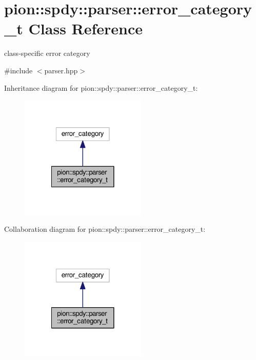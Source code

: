 \hypertarget{classpion_1_1spdy_1_1parser_1_1error__category__t}{\section{pion\-:\-:spdy\-:\-:parser\-:\-:error\-\_\-category\-\_\-t Class Reference}
\label{classpion_1_1spdy_1_1parser_1_1error__category__t}
}


class-\/specific error category  




{\ttfamily \#include $<$parser.\-hpp$>$}



Inheritance diagram for pion\-:\-:spdy\-:\-:parser\-:\-:error\-\_\-category\-\_\-t\-:
\nopagebreak
\begin{figure}[H]
\begin{center}
\leavevmode
\includegraphics[width=170pt]{classpion_1_1spdy_1_1parser_1_1error__category__t__inherit__graph}
\end{center}
\end{figure}


Collaboration diagram for pion\-:\-:spdy\-:\-:parser\-:\-:error\-\_\-category\-\_\-t\-:
\nopagebreak
\begin{figure}[H]
\begin{center}
\leavevmode
\includegraphics[width=170pt]{classpion_1_1spdy_1_1parser_1_1error__category__t__coll__graph}
\end{center}
\end{figure}
